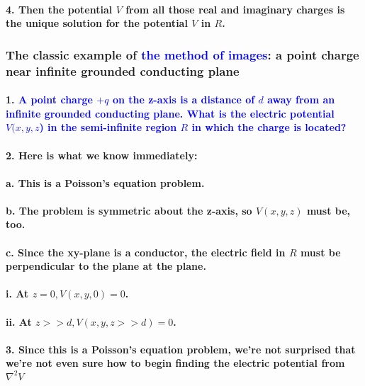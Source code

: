 \documentclass{article}
\begin{document}
\paragraph{4. Then the potential $V$ from all those real and imaginary charges is the unique solution for the potential $V$ in $R$.}
\subsubsection{The classic example of \textcolor{blue}{the method of images}: a point charge near infinite grounded conducting plane}
\paragraph{1. \textcolor{blue}{A point charge $+q$ on the z-axis is a distance of $d$ away from an infinite grounded conducting plane. What is the electric potential $V(x,y,z$) in the semi-infinite region $R$ in which the charge is located?}}
\paragraph{2. Here is what we know immediately:}
\paragraph{\indent a. This is a Poisson's equation problem.}
\paragraph{\indent b. The problem is symmetric about the z-axis, so $V(x,y,z)$ must be, too.}
\paragraph{\indent c. Since the xy-plane is a conductor, the electric field in $R$ must be perpendicular to the plane at the plane.}
\paragraph{\indent \indent i. At $z=0, V(x,y,0)=0$.}
\paragraph{\indent \indent ii. At $z>>d, V(x,y,z>>d)=0$.}
\paragraph{3. Since this is a Poisson's equation problem, we're not surprised that we're not even sure how to begin finding the electric potential from $\nabla^2V$}
\end{document}
